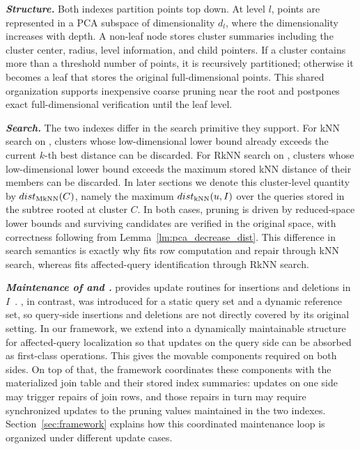 \noindent\textbf{\textit{Structure.}}
Both indexes partition points top down. At level $l$, points are represented in a PCA subspace of dimensionality $d_l$, where the dimensionality increases with depth. A non-leaf node stores cluster summaries including the cluster center, radius, level information, and child pointers. If a cluster contains more than a threshold number of points, it is recursively partitioned; otherwise it becomes a leaf that stores the original full-dimensional points. This shared organization supports inexpensive coarse pruning near the root and postpones exact full-dimensional verification until the leaf level.

\noindent\textbf{\textit{Search.}}
The two indexes differ in the search primitive they support. For kNN search on \deltatree, clusters whose low-dimensional lower bound already exceeds the current $k$-th best distance can be discarded. For RkNN search on \hdrtree, clusters whose low-dimensional lower bound exceeds the maximum stored kNN distance of their members can be discarded. In later sections we denote this cluster-level quantity by $dist_{\operatorname{MkNN}}(C)$, namely the maximum $dist_{\operatorname{kNN}}(u,I)$ over the queries stored in the subtree rooted at cluster $C$. In both cases, pruning is driven by reduced-space lower bounds and surviving candidates are verified in the original space, with correctness following from Lemma~\ref{lm:pca_decrease_dist}. This difference in search semantics is exactly why \deltatree fits row computation and repair through kNN search, whereas \hdrtree fits affected-query identification through RkNN search.

\noindent\textbf{\textit{Maintenance of \deltatree and \hdrtree.}}
\deltatree provides update routines for insertions and deletions in $I$~\cite{cui2003contorting}. \hdrtree, in contrast, was introduced for a static query set and a dynamic reference set, so query-side insertions and deletions are not directly covered by its original setting. In our framework, we extend \hdrtree into a dynamically maintainable structure for affected-query localization so that updates on the query side can be absorbed as first-class operations. This gives \dualtree the movable components required on both sides. On top of that, the framework coordinates these components with the materialized join table and their stored index summaries: updates on one side may trigger repairs of join rows, and those repairs in turn may require synchronized updates to the pruning values maintained in the two indexes. Section~\ref{sec:framework} explains how this coordinated maintenance loop is organized under different update cases.


